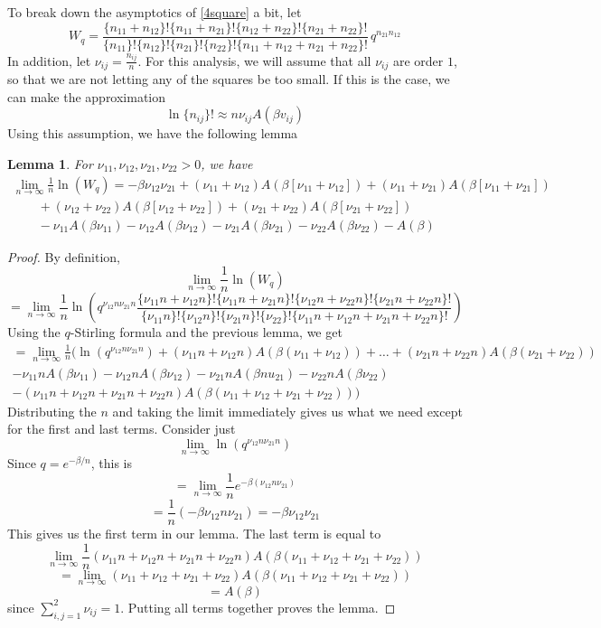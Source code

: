 \documentclass[12pt]{report}
\newtheorem{lem}[thm]{Lemma}
\theoremstyle{definition}
\begin{document}
To break down the asymptotics of \ref{4square} a bit, let 
$$
W_q = \frac{\{n_{11}+n_{12}\}!\{n_{11}+n_{21}\}!\{n_{12}+n_{22}\}!\{n_{21}+n_{22}\}!}
{\{n_{11}\}!\{n_{12}\}!\{n_{21}\}!\{n_{22}\}!\{n_{11}+n_{12}+n_{21}+n_{22}\}!}\,q^{n_{21}n_{12}}
$$
In addition, let $\nu_{ij}=\frac{n_{ij}}{n}$.  For this analysis, we will assume that all $\nu_{ij}$ are order $1$, so that we are not letting any of the squares be too small.  If this is the case, we can make the approximation 
$$
\ln\{n_{ij}\}!\approx n\nu_{ij}A(\beta v_{ij})
$$
Using this assumption, we have the following lemma
\begin{lem}
For $\nu_{11}, \nu_{12}, \nu_{21}, \nu_{22}>0$, we have 
\begin{multline}
\lim_{n\rightarrow\infty} \frac{1}{n}\ln(W_q)= -\beta \nu_{12} \nu_{21} + (\nu_{11}+\nu_{12}) A(\beta[\nu_{11}+\nu_{12}]) 
+ (\nu_{11}+\nu_{21}) A(\beta[\nu_{11}+\nu_{21}])\\
\qquad + (\nu_{12}+\nu_{22}) A(\beta[\nu_{12}+\nu_{22}])
+ (\nu_{21}+\nu_{22}) A(\beta[\nu_{21}+\nu_{22}])\\
\qquad - \nu_{11} A(\beta \nu_{11})
- \nu_{12} A(\beta \nu_{12})
- \nu_{21} A(\beta \nu_{21})
- \nu_{22} A(\beta \nu_{22})
- A(\beta)
\end{multline}
\end{lem}
\begin{proof}
By definition, 
$$
\lim_{n\rightarrow\infty}\frac{1}{n}\ln(W_q)
$$
$$
=\lim_{n\rightarrow\infty} \frac{1}{n}\ln\left(q^{\nu_{12}n\nu_{21}n}\frac{\{\nu_{11}n+\nu_{12}n\}!\{\nu_{11}n+\nu_{21}n\}!\{\nu_{12}n+\nu_{22}n\}!\{\nu_{21}n+\nu_{22}n\}!}{\{\nu_{11}n\}!\{\nu_{12}n\}!\{\nu_{21}n\}!\{\nu_{22}\}!\{\nu_{11}n+\nu_{12}n+\nu_{21}n+\nu_{22}n\}!}\right)
$$
Using the $q$-Stirling formula and the previous lemma, we get
\begin{multline}
=\lim_{n\rightarrow\infty}\frac{1}{n}( \ln\left(q^{\nu_{12}n\nu_{21}n}
\right)+ (\nu_{11}n+\nu_{12}n)A(\beta(\nu_{11}+\nu_{12}))+\dots + (\nu_{21}n+\nu_{22}n)A(\beta(\nu_{21}+\nu_{22})) \\
-\nu_{11}nA(\beta\nu_{11})-\nu_{12}nA(\beta\nu_{12})-\nu_{21}nA(\beta nu_{21})-\nu_{22}nA(\beta \nu_{22}) \\
-(\nu_{11}n+\nu_{12}n+\nu_{21}n+\nu_{22}n)A(\beta(\nu_{11}+\nu_{12}+\nu_{21}+\nu_{22})) )
\end{multline}
Distributing the $n$ and taking the limit immediately gives us what we need except for the first and last terms.  Consider just 
$$
\lim_{n\rightarrow\infty}\ln(q^{\nu_{12}n\nu_{21}n})
$$
Since $q=e^{-\beta/n}$, this is
$$
=\lim_{n\rightarrow\infty}\frac{1}{n}e^{-\beta(\nu_{12}n\nu_{21})}
$$
$$
=\frac{1}{n}(-\beta\nu_{12}n\nu_{21})=-\beta\nu_{12}\nu_{21}
$$
This gives us the first term in our lemma.  The last term is equal to 
$$
\lim_{n\rightarrow\infty}\frac{1}{n}(\nu_{11}n+\nu_{12}n+\nu_{21}n+\nu_{22}n)A(\beta(\nu_{11}+\nu_{12}+\nu_{21}+\nu_{22}))
$$
$$
=\lim_{n\rightarrow\infty}(\nu_{11}+\nu_{12}+\nu_{21}+\nu_{22})A(\beta(\nu_{11}+\nu_{12}+\nu_{21}+\nu_{22}))
$$
$$
=A(\beta)
$$
since $\sum_{i,j=1}^2\nu_{ij}=1$. Putting all terms together proves the lemma.  
\end{proof}
\end{document}
